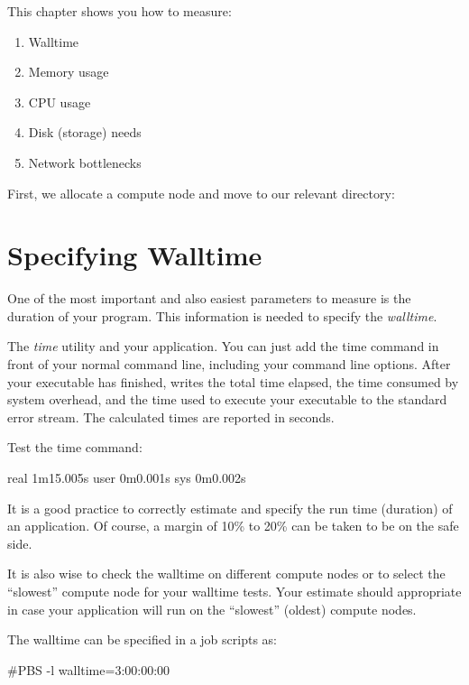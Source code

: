 This chapter shows you how to measure:

\begin{enumerate}
\item  Walltime
\item  Memory usage
\item  CPU usage
\item  Disk (storage) needs
\item  Network bottlenecks
\end{enumerate}

First, we allocate a compute node and move to our relevant directory:
\begin{prompt}
\end{prompt}

\section{Specifying Walltime}

One of the most important and also easiest parameters to measure is the
duration of your program. This information is needed to specify the
\emph{walltime}.

The \emph{time} utility  and  your application.
You can just add the time command in front of your normal command line,
including your command line options. After your executable has finished,
 writes the total time elapsed, the time consumed by system
overhead, and the time used to execute your executable to the standard error
stream. The calculated times are reported in seconds.


Test the time command:
\begin{prompt}
real 1m15.005s
user 0m0.001s
sys 0m0.002s
\end{prompt}

It is a good practice to correctly estimate and specify the run time (duration)
of an application. Of course, a margin of 10\% to 20\% can be taken to be on
the safe side.

It is also wise to check the walltime on different compute nodes or to select
the ``slowest'' compute node for your walltime tests. Your estimate should
appropriate in case your application will run on the ``slowest'' (oldest)
compute nodes.

The walltime can be specified in a job scripts as:
\begin{prompt}
#PBS -l walltime=3:00:00:00
\end{prompt}

